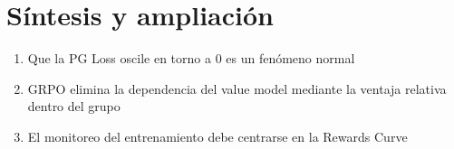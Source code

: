\section{Síntesis y ampliación}
\begin{enumerate}
  \item Que la PG Loss oscile en torno a 0 es un fenómeno normal
  \item GRPO elimina la dependencia del value model mediante la ventaja relativa dentro del grupo
  \item El monitoreo del entrenamiento debe centrarse en la Rewards Curve
\end{enumerate}

